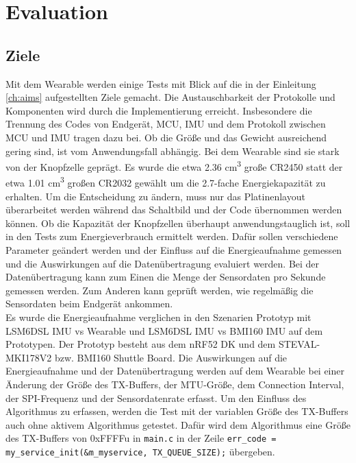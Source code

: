 \chapter{Evaluation}
\label{ch:evaluation}

\section{Ziele}
\label{ch:aimEval}
Mit dem Wearable werden einige Tests mit Blick auf die in der Einleitung \ref{ch:aims} aufgestellten Ziele gemacht.
Die Austauschbarkeit der Protokolle und Komponenten wird durch die Implementierung erreicht.
Insbesondere die Trennung des Codes von Endgerät, MCU, IMU und dem Protokoll zwischen MCU und IMU tragen dazu bei.
Ob die Größe und das Gewicht ausreichend gering sind, ist vom Anwendungsfall abhängig.
Bei dem Wearable sind sie stark von der Knopfzelle geprägt.
Es wurde die etwa 2.36 cm\textsuperscript{3} große CR2450 statt der etwa 1.01 cm\textsuperscript{3} großen CR2032 gewählt um die 2.7-fache Energiekapazität zu erhalten.
Um die Entscheidung zu ändern, muss nur das Platinenlayout überarbeitet werden während das Schaltbild und der Code übernommen werden können.
Ob die Kapazität der Knopfzellen überhaupt anwendungstauglich ist, soll in den Tests zum Energieverbrauch ermittelt werden.
Dafür sollen verschiedene Parameter geändert werden und der Einfluss auf die Energieaufnahme gemessen und die Auswirkungen auf die Datenübertragung evaluiert werden.
Bei der Datenübertragung kann zum Einen die Menge der Sensordaten pro Sekunde gemessen werden.
Zum Anderen kann geprüft werden, wie regelmäßig die Sensordaten beim Endgerät ankommen.\\
Es wurde die Energieaufnahme verglichen in den Szenarien Prototyp mit LSM6DSL IMU vs Wearable und LSM6DSL IMU vs BMI160 IMU auf dem Prototypen.
Der Prototyp besteht aus dem nRF52 DK und dem STEVAL-MKI178V2 bzw. BMI160 Shuttle Board.
Die Auswirkungen auf die Energieaufnahme und der Datenübertragung werden auf dem Wearable bei einer Änderung der Größe des TX-Buffers, der MTU-Größe, dem Connection Interval, der SPI-Frequenz und der Sensordatenrate erfasst.
Um den Einfluss des Algorithmus zu erfassen, werden die Test mit der variablen Größe des TX-Buffers auch ohne aktivem Algorithmus getestet.
Dafür wird dem Algorithmus eine Größe des TX-Buffers von 0xFFFFu in \texttt{main.c} in der Zeile \texttt{err\_code = my\_service\_init(\allowbreak{}\&m\_myservice, TX\_QUEUE\_SIZE);} übergeben.


